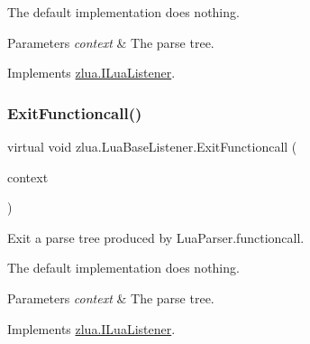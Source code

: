 The default implementation does nothing.


\begin{DoxyParams}{Parameters}
{\em context} & The parse tree.\\
\hline
\end{DoxyParams}


Implements \mbox{\hyperlink{interfacezlua_1_1_i_lua_listener_aeae3611ef79ccd5c902a1016ebc2f6e4}{zlua.\+I\+Lua\+Listener}}.

\mbox{\label{classzlua_1_1_lua_base_listener_ac08101b052d2965f37939320ba03e792}} 
\subsubsection{\texorpdfstring{Exit\+Functioncall()}{ExitFunctioncall()}}
{\footnotesize\ttfamily virtual void zlua.\+Lua\+Base\+Listener.\+Exit\+Functioncall (\begin{DoxyParamCaption}\item[{\mbox{[}\+Not\+Null\mbox{]} \mbox{\hyperlink{classzlua_1_1_lua_parser_1_1_functioncall_context}{Lua\+Parser.\+Functioncall\+Context}}}]{context }\end{DoxyParamCaption})\hspace{0.3cm}{\ttfamily [virtual]}}



Exit a parse tree produced by Lua\+Parser.\+functioncall. 

The default implementation does nothing.


\begin{DoxyParams}{Parameters}
{\em context} & The parse tree.\\
\hline
\end{DoxyParams}


Implements \mbox{\hyperlink{interfacezlua_1_1_i_lua_listener_acd0b2537f173e36443c60445ef23eeb6}{zlua.\+I\+Lua\+Listener}}.

\mbox{\label{classzlua_1_1_lua_base_listener_adb6913ed219a112505cb4ba783485c2e}} 
